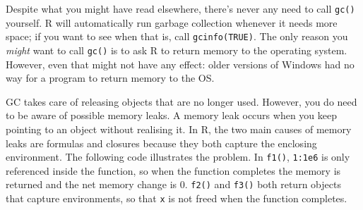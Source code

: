 \begin{Shaded}
\begin{Highlighting}[]
\StringTok{ }\NormalTok{:}\NormalTok{)}
\StringTok{ }
\NormalTok{(}
\NormalTok{(}
\end{Highlighting}
\end{Shaded}

Despite what you might have read elsewhere, there's never any need to
call \texttt{gc()} yourself. R will automatically run garbage collection
whenever it needs more space; if you want to see when that is, call
\texttt{gcinfo(TRUE)}. The only reason you \emph{might} want to call
\texttt{gc()} is to ask R to return memory to the operating system.
However, even that might not have any effect: older versions of Windows
had no way for a program to return memory to the OS. 

GC takes care of releasing objects that are no longer used. However, you
do need to be aware of possible memory leaks. A memory leak occurs when
you keep pointing to an object without realising it. In R, the two main
causes of memory leaks are formulas and closures because they both
capture the enclosing environment. The following code illustrates the
problem. In \texttt{f1()}, \texttt{1:1e6} is only referenced inside the
function, so when the function completes the memory is returned and the
net memory change is 0. \texttt{f2()} and \texttt{f3()} both return
objects that capture environments, so that \texttt{x} is not freed when
the function completes. 

